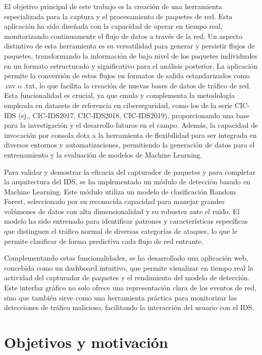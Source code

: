 El objetivo principal de este trabajo es la creación de una herramienta especializada para la captura y el procesamiento de paquetes de red. Esta aplicación ha sido diseñada con la capacidad de operar en tiempo real, monitorizando continuamente el flujo de datos a través de la red. Un aspecto distintivo de esta herramienta es su versatilidad para generar y persistir flujos de paquetes, transformando la información de bajo nivel de los paquetes individuales en un formato estructurado y significativo para el análisis posterior. La aplicación permite la conversión de estos flujos en formatos de salida estandarizados como .csv o .txt, lo que facilita la creación de nuevas bases de datos de tráfico de red. Esta funcionalidad es crucial, ya que emula y complementa la metodología empleada en datasets de referencia en ciberseguridad, como los de la serie CIC-IDS (ej., CIC-IDS2017, CIC-IDS2018, CIC-IDS2019), proporcionando una base para la investigación y el desarrollo futuros en el campo. Además, la capacidad de invocación por consola dota a la herramienta de flexibilidad para ser integrada en diversos entornos y automatizaciones, permitiendo la generación de datos para el entrenamiento y la evaluación de modelos de Machine Learning.

Para validar y demostrar la eficacia del capturador de paquetes y para completar la arquitectura del IDS, se ha implementado un módulo de detección basado en Machine Learning. Este módulo utiliza un modelo de clasificación Random Forest, seleccionado por su reconocida capacidad para manejar grandes volúmenes de datos con alta dimensionalidad y su robustez ante el ruido. El modelo ha sido entrenado para identificar patrones y características específicas que distinguen el tráfico normal de diversas categorías de ataques, lo que le permite clasificar de forma predictiva cada flujo de red entrante.

Complementando estas funcionalidades, se ha desarrollado una aplicación web, concebida como un dashboard intuitivo, que permite visualizar en tiempo real la actividad del capturador de paquetes y el rendimiento del modelo de detección. Este interfaz gráfico no solo ofrece una representación clara de los eventos de red, sino que también sirve como una herramienta práctica para monitorizar las detecciones de tráfico malicioso, facilitando la interacción del usuario con el IDS.

\section{Objetivos y motivación}

